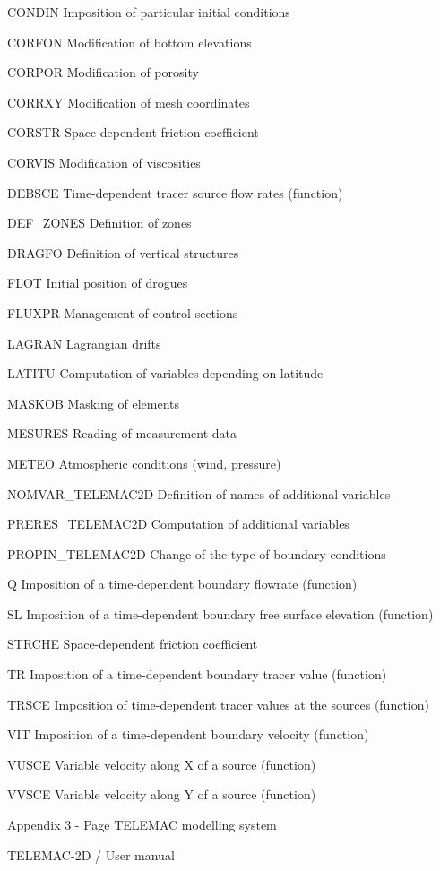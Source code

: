 \documentclass{article} %
\begin{document}
 CONDIN Imposition of particular initial conditions

 CORFON Modification of bottom elevations

 CORPOR Modification of porosity

 CORRXY Modification of mesh coordinates

 CORSTR Space-dependent friction coefficient

 CORVIS Modification of viscosities

 DEBSCE Time-dependent tracer source flow rates (function)

 DEF\_ZONES Definition of zones

 DRAGFO Definition of vertical structures

 FLOT Initial position of drogues

 FLUXPR Management of control sections

 LAGRAN Lagrangian drifts

 LATITU Computation of variables depending on latitude

 MASKOB Masking of elements

 MESURES Reading of measurement data

 METEO Atmospheric conditions (wind, pressure)

 NOMVAR\_TELEMAC2D Definition of names of additional variables

 PRERES\_TELEMAC2D Computation of additional variables

 PROPIN\_TELEMAC2D Change of the type of boundary conditions

 Q Imposition of a time-dependent boundary flowrate (function)

 SL Imposition of a time-dependent boundary free surface elevation (function)

 STRCHE Space-dependent friction coefficient

 TR Imposition of a time-dependent boundary tracer value (function)

 TRSCE Imposition of time-dependent tracer values at the sources (function)

 VIT Imposition of a time-dependent boundary velocity (function)

 VUSCE Variable velocity along X of a source (function)

 VVSCE Variable velocity along Y of a source (function)

 Appendix 3 - Page   TELEMAC modelling system

 TELEMAC-2D / User manual
\end{document}
